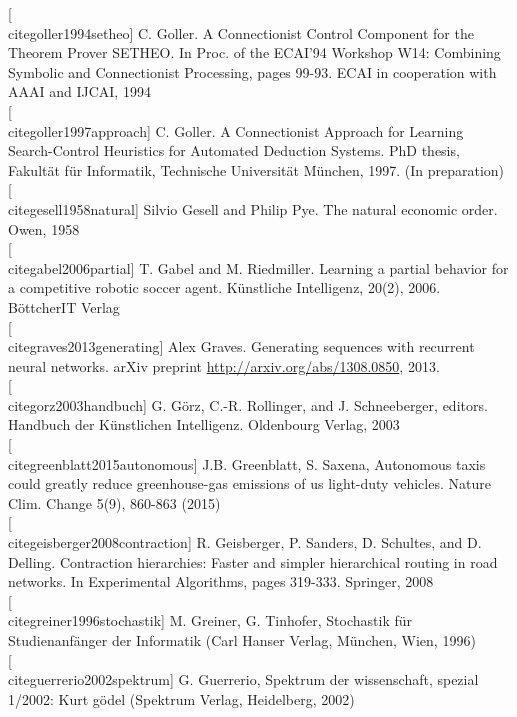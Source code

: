 \documentclass[10pt]{book}
\begin{document}
[\\cite{goller1994setheo}] C. Goller. A Connectionist Control Component for the Theorem Prover SETHEO. In Proc. of the ECAI'94 Workshop W14: Combining Symbolic and Connectionist Processing, pages 99-93. ECAI in cooperation with AAAI and IJCAI, 1994\\[0pt]
[\\cite{goller1997approach}] C. Goller. A Connectionist Approach for Learning Search-Control Heuristics for Automated Deduction Systems. PhD thesis, Fakultät für Informatik, Technische Universität München, 1997. (In preparation)\\[0pt]
[\\cite{gesell1958natural}] Silvio Gesell and Philip Pye. The natural economic order. Owen, 1958\\[0pt]
[\\cite{gabel2006partial}] T. Gabel and M. Riedmiller. Learning a partial behavior for a competitive robotic soccer agent. Künstliche Intelligenz, 20(2), 2006. BöttcherIT Verlag\\[0pt]
[\\cite{graves2013generating}] Alex Graves. Generating sequences with recurrent neural networks. arXiv preprint \href{http://arxiv.org/abs/1308.0850}{http://arxiv.org/abs/1308.0850}, 2013.\\[0pt]
[\\cite{gorz2003handbuch}] G. Görz, C.-R. Rollinger, and J. Schneeberger, editors. Handbuch der Künstlichen Intelligenz. Oldenbourg Verlag, 2003\\[0pt]
[\\cite{greenblatt2015autonomous}] J.B. Greenblatt, S. Saxena, Autonomous taxis could greatly reduce greenhouse-gas emissions of us light-duty vehicles. Nature Clim. Change 5(9), 860-863 (2015)\\[0pt]
[\\cite{geisberger2008contraction}] R. Geisberger, P. Sanders, D. Schultes, and D. Delling. Contraction hierarchies: Faster and simpler hierarchical routing in road networks. In Experimental Algorithms, pages 319-333. Springer, 2008\\[0pt]
[\\cite{greiner1996stochastik}] M. Greiner, G. Tinhofer, Stochastik für Studienanfänger der Informatik (Carl Hanser Verlag, München, Wien, 1996)\\[0pt]
[\\cite{guerrerio2002spektrum}] G. Guerrerio, Spektrum der wissenschaft, spezial 1/2002: Kurt gödel (Spektrum Verlag, Heidelberg, 2002)\\[0pt]
\end{document}
